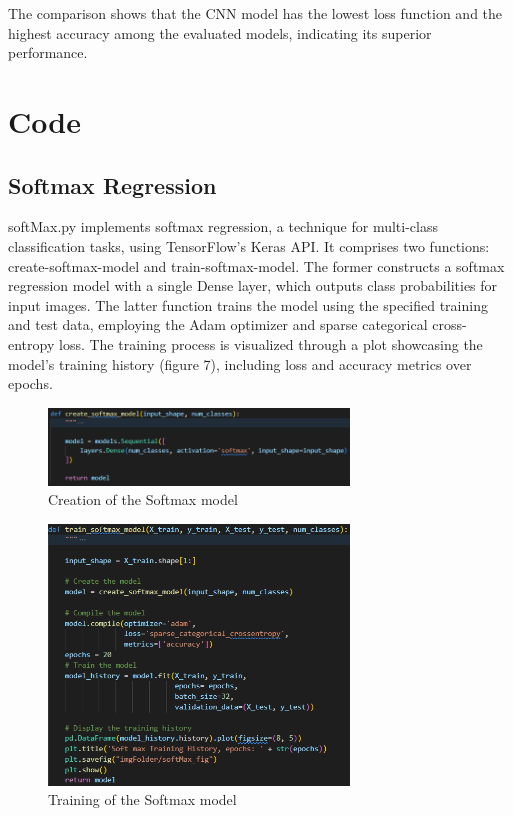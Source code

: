 \documentclass{article}
\begin{document}
The comparison shows that the CNN model has the lowest loss function and the highest accuracy among the evaluated models, indicating its superior performance.
\newpage
\section{Code}
\subsection{Softmax Regression}
softMax.py implements softmax regression, a technique for multi-class classification tasks, using TensorFlow's Keras API. It comprises two functions: create-softmax-model and train-softmax-model. The former constructs a softmax regression model with a single Dense layer, which outputs class probabilities for input images. The latter function trains the model using the specified training and test data, employing the Adam optimizer and sparse categorical cross-entropy loss. The training process is visualized through a plot showcasing the model's training history (figure 7), including loss and accuracy metrics over epochs.

\begin{figure}[H]
    \caption{Creation of the Softmax model}
    \centering
    \includegraphics[width=8cm]{../imgFolder/create_softmax_model.png}
\end{figure}

\begin{figure}[H]
    \caption{Training of the Softmax model}
    \centering
    \includegraphics[width=8cm]{../imgFolder/train_softmax_model.png}
\end{figure}
\end{document}
